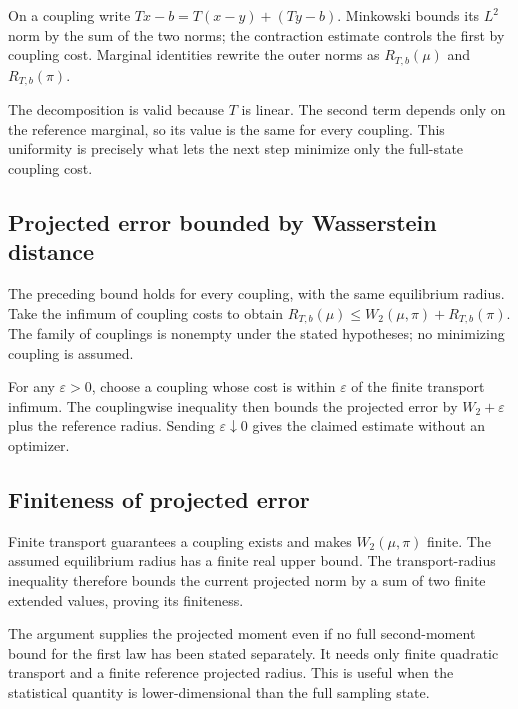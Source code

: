 \documentclass[11pt,a4paper]{article}
\begin{document}
On a coupling write \(Tx-b=T(x-y)+(Ty-b)\). Minkowski bounds its \(L^2\) norm by the sum of the two norms; the contraction estimate controls the first by coupling cost. Marginal identities rewrite the outer norms as \(R_{T,b}(\mu)\) and \(R_{T,b}(\pi)\).



The decomposition is valid because \(T\) is linear. The second term depends only on the reference marginal, so its value is the same for every coupling. This uniformity is precisely what lets the next step minimize only the full-state coupling cost.


\subsection{\texorpdfstring{Projected error bounded by Wasserstein distance}{Projected error bounded by Wasserstein distance}}


The preceding bound holds for every coupling, with the same equilibrium radius. Take the infimum of coupling costs to obtain \(R_{T,b}(\mu)\le W_2(\mu,\pi)+R_{T,b}(\pi)\). The family of couplings is nonempty under the stated hypotheses; no minimizing coupling is assumed.



For any \(\varepsilon>0\), choose a coupling whose cost is within \(\varepsilon\) of the finite transport infimum. The couplingwise inequality then bounds the projected error by \(W_2+\varepsilon\) plus the reference radius. Sending \(\varepsilon\downarrow0\) gives the claimed estimate without an optimizer.


\subsection{\texorpdfstring{Finiteness of projected error}{Finiteness of projected error}}


Finite transport guarantees a coupling exists and makes \(W_2(\mu,\pi)\) finite. The assumed equilibrium radius has a finite real upper bound. The transport-radius inequality therefore bounds the current projected norm by a sum of two finite extended values, proving its finiteness.



The argument supplies the projected moment even if no full second-moment bound for the first law has been stated separately. It needs only finite quadratic transport and a finite reference projected radius. This is useful when the statistical quantity is lower-dimensional than the full sampling state.
\end{document}
